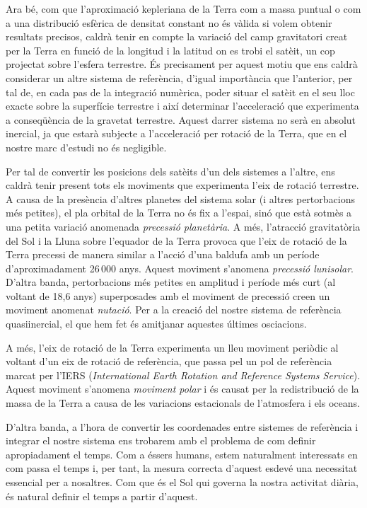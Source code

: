 \documentclass{article}
\begin{document}
Ara bé, com que l'aproximació kepleriana de la Terra com a massa puntual o com a una distribució esfèrica de densitat constant no és vàlida si volem obtenir resultats precisos, caldrà tenir en compte la variació del camp gravitatori creat per la Terra en funció de la longitud i la latitud on es trobi el satè\lgem it, un cop projectat sobre l'esfera terrestre. És precisament per aquest motiu que ens caldrà considerar un altre sistema de referència, d'igual importància que l'anterior, per tal de, en cada pas de la integració numèrica, poder situar el satè\lgem it en el seu lloc exacte sobre la superfície terrestre i així determinar l'acceleració que experimenta a conseqüència de la gravetat terrestre. Aquest darrer sistema no serà en absolut inercial, ja que estarà subjecte a l'acceleració per rotació de la Terra, que en el nostre marc d'estudi no és negligible.

Per tal de convertir les posicions dels satè\lgem its d'un dels sistemes a l'altre, ens caldrà tenir present tots els moviments que experimenta l'eix de rotació terrestre. A causa de la presència d'altres planetes del sistema solar (i altres pertorbacions més petites), el pla orbital de la Terra no és fix a l'espai, sinó que està sotmès a una petita variació anomenada \emph{precessió planetària}. A més, l'atracció gravitatòria del Sol i la Lluna sobre l'equador de la Terra provoca que l'eix de rotació de la Terra precessi de manera similar a l'acció d'una baldufa amb un període d'aproximadament 26\,000 anys. Aquest moviment s'anomena \emph{precessió lunisolar}. D'altra banda, pertorbacions més petites en amplitud i període més curt (al voltant de 18,6 anys) superposades amb el moviment de precessió creen un moviment anomenat \emph{nutació}. Per a la creació del nostre sistema de referència quasiinercial, el que hem fet és amitjanar aquestes últimes osci\lgem acions.

A més, l'eix de rotació de la Terra experimenta un lleu moviment periòdic al voltant d'un eix de rotació de referència, que passa pel un pol de referència marcat per l'IERS (\emph{International Earth Rotation and Reference Systems Service}). Aquest moviment s'anomena \emph{moviment polar} i és causat per la redistribució de la massa de la Terra a causa de les variacions estacionals de l'atmosfera i els oceans.

D'altra banda, a l'hora de convertir les coordenades entre sistemes de referència i integrar el nostre sistema ens trobarem amb el problema de com definir apropiadament el temps.
Com a éssers humans, estem naturalment interessats en com passa el temps i, per tant, la mesura correcta d'aquest esdevé una necessitat essencial per a nosaltres. Com que és el Sol qui governa la nostra activitat diària, és natural definir el temps a partir d'aquest.
\end{document}

